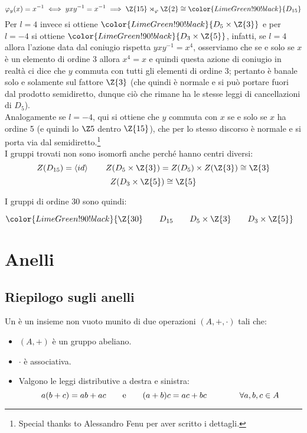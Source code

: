 \documentclass[11pt]{scrartcl}
\begin{document}
\begin{example}
\begin{itemize}
                \[ \varphi_y(x) = x^{-1} \iff yxy^{-1} = x^{-1} \implies \Z{15} \rtimes_{\varphi} \Z{2} \cong  \color{LimeGreen!90!black}{D_{15}}
                    \]
            Per $l = 4$ invece si ottiene $\color{LimeGreen!90!black}{D_5 \times \Z{3}}$ e per $l = -4$ si ottiene $\color{LimeGreen!90!black}{D_3 \times \Z{5}}$, infatti, se $l=4$ allora l'azione data dal coniugio rispetta
            $yxy^{-1}=x^4$, osserviamo che se e solo se $x$ è un elemento di ordine 3 allora $x^4=x$ e quindi questa azione di coniugio in realtà ci dice che $y$ commuta con tutti gli elementi di ordine 3; pertanto è banale solo
            e solamente sul fattore $\Z{3}$ (che quindi è normale e si può portare fuori dal prodotto semidiretto, dunque ciò che rimane ha le stesse leggi di cancellazioni di $D_5$).\\
            Analogamente se $l=-4$, qui si ottiene che $y$ commuta con $x$ se e solo se $x$ ha ordine 5 (e quindi lo $\Z5$ dentro $\Z{15}$), che per lo stesso discorso è normale e si porta via dal semidiretto.\footnote{Special thanks to Alessandro Fenu per aver scritto i dettagli.}\\
            I gruppi trovati non sono isomorfi anche perché hanno centri diversi:
                \[ Z(D_{15}) = \left<id\right> \qquad Z(D_5 \times \Z{3}) = Z(D_5) \times Z(\Z{3}) \cong \Z{3} \]
                \[ Z(D_3 \times \Z{5}) \cong \Z{5}
                    \]
    \end{itemize}
\end{example}
I gruppi di ordine 30 sono quindi:
    \begin{center}
        $\color{LimeGreen!90!black}{\Z{30} \qquad D_{15} \qquad D_5 \times \Z{3} \qquad D_3 \times \Z{5}}$
    \end{center}
    
\newpage


\section{Anelli}
\subsection{Riepilogo sugli anelli}
\begin{definition}
    Un  è un insieme non vuoto munito di due operazioni $(A,+,\cdot)$ tali che:
    \begin{itemize}
        \item $(A,+)$ è un gruppo abeliano.
        \item $\cdot$ è associativa.
        \item Valgono le leggi distributive a destra e sinistra:
            \[ a(b+c) = ab + ac \qquad \text e \qquad (a+b)c = ac + bc \qquad \qquad \forall a,b,c \in A
                \]
    \end{itemize}
\end{definition}
\end{document}
